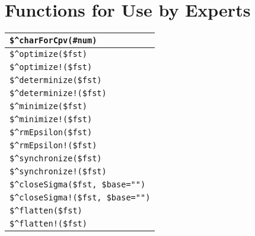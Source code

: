 \section{Functions for Use by Experts}

\begin{tabular}{|l|}
\hline
\verb!$^charForCpv(#num)! \\
\hline
\verb!$^optimize($fst)! \\
\verb/$^optimize!($fst)/ \\
\verb!$^determinize($fst)! \\
\verb/$^determinize!($fst)/ \\
\verb!$^minimize($fst)! \\
\verb/$^minimize!($fst)/ \\
\verb!$^rmEpsilon($fst)! \\
\verb/$^rmEpsilon!($fst)/ \\
\verb!$^synchronize($fst)! \\
\verb/$^synchronize!($fst)/ \\
\hline
\verb/$^closeSigma($fst, $base="")/\\
\verb/$^closeSigma!($fst, $base="")/\\
\hline
\verb/$^flatten($fst)/\\
\verb/$^flatten!($fst)/\\
\hline
\end{tabular}

